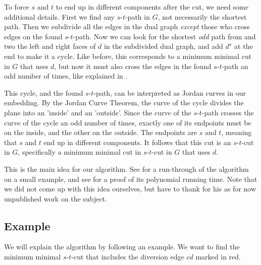 To force $s$ and $t$ to end up in different components after the cut, we need some additional details. First we find any $s$-$t$-path in $G$, not necessarily the shortest path. Then we subdivide all the edges in the dual graph \emph{except} those who cross edges on the found $s$-$t$-path. Now we can look for the shortest \emph{odd} path from and two the left and right faces of $d$ in the subdivided dual graph, and add $d^\star$ at the end to make it a cycle. Like before, this corresponds to a minimum minimal cut in $G$ that uses $d$, but now it must also cross the edges in the found $s$-$t$-path an odd number of times, like explained in . 

This cycle, and the found $s$-$t$-path, can be interpreted as Jordan curves in our embedding. By the Jordan Curve Theorem, the curve of the cycle divides the plane into an 'inside' and an 'outside'. Since the curve of the $s$-$t$-path crosses the curve of the cycle an odd number of times, exactly one of its endpoints must be on the inside, and the other on the outside. The endpoints are $s$ and $t$, meaning that $s$ and $t$ end up in different components. It follows that this cut is an $s$-$t$-cut in $G$, specifically a minimum minimal cut in $s$-$t$-cut in $G$ that uses $d$.

This is the main idea for our algorithm. See  for a run-through of the algorithm on a small example, and see  for a proof of its polynomial running time. Note that we did not come up with this idea ourselves, but have to thank \cite{source:pål} for his as for now unpublished work on the subject.

\subsection{Example}
\label{subsection:network-diversion-example}
We will explain the algorithm by following an example. We want to find the minimum minimal $s$-$t$-cut that includes the diversion edge $cd$ marked in red. 

